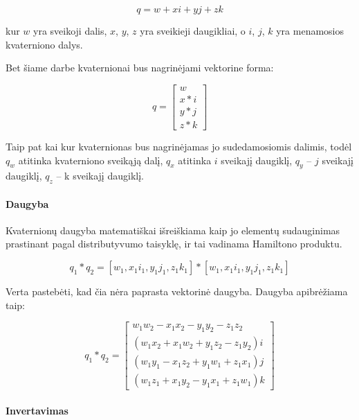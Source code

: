\documentclass[12pt, a4paper, lithuanian, final]{article}
\begin{document}
\begin{equation}
	q = w + xi + yj + zk
\end{equation}

kur $w$ yra sveikoji dalis, $x$, $y$, $z$ yra sveikieji daugikliai, o $i$, $j$, $k$ yra menamosios kvaterniono dalys.

Bet šiame darbe kvaternionai bus nagrinėjami vektorine forma:

\begin{equation}
	q = \left[
		\begin{array}{c}
			w \\
			x * i \\
			y * j \\
			z * k
		\end{array}
	\right]
\end{equation}

Taip pat kai kur kvaternionas bus nagrinėjamas jo sudedamosiomis dalimis, todėl $q_w$ atitinka kvaterniono sveikąją dalį, $q_x$ atitinka $i$ sveikajį daugiklį, $q_y$ -- $j$ sveikajį daugiklį, $q_z$ -- k sveikajį daugiklį.



\paragraph{Daugyba}

Kvaternionų daugyba matematiškai išreiškiama kaip jo elementų sudauginimas prastinant pagal distributyvumo taisyklę, ir tai vadinama Hamiltono produktu.

\begin{equation}
	q_1 * q_2 = \left[ w_1, x_1 i_1, y_1j_1, z_1k_1 \right] * \left[ w_1, x_1 i_1, y_1j_1, z_1k_1 \right]
\end{equation}

Verta pastebėti, kad čia nėra paprasta vektorinė daugyba.
Daugyba apibrėžiama taip:

\begin{equation}
	q_1 * q_2 = \left[
		\begin{array}{c}
			w_1 w_2 - x_1 x_2 - y_1 y_2 - z_1 z_2 \\
			(w_1 x_2 + x_1 w_2 + y_1 z_2 - z_1 y_2) i \\
			(w_1 y_1 - x_1 z_2 + y_1 w_1 + z_1 x_1) j \\
			(w_1 z_1 + x_1 y_2 - y_1 x_1 + z_1 w_1) k
		\end{array}
	\right]
\end{equation}

\paragraph{Invertavimas}
\end{document}
